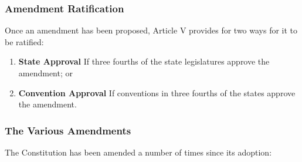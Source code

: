 \subsubsection{Amendment Ratification}
Once an amendment has been proposed, Article V provides for two ways for it to be ratified:
\begin{enumerate}
\item \textbf{State Approval} If three fourths of the state legislatures approve the amendment; or
\item \textbf{Convention Approval} If conventions in three fourths of the states approve the amendment.
\end{enumerate}


\subsubsection{The Various Amendments}

The Constitution has been amended a number of times since its adoption:

